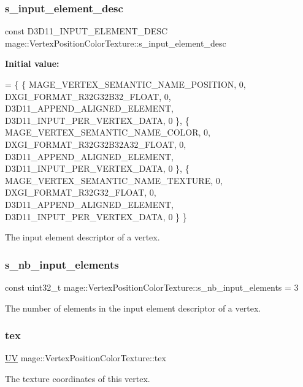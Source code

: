 \subsubsection{\texorpdfstring{s\+\_\+input\+\_\+element\+\_\+desc}{s\_input\_element\_desc}}
{\footnotesize\ttfamily const D3\+D11\+\_\+\+I\+N\+P\+U\+T\+\_\+\+E\+L\+E\+M\+E\+N\+T\+\_\+\+D\+E\+SC mage\+::\+Vertex\+Position\+Color\+Texture\+::s\+\_\+input\+\_\+element\+\_\+desc\hspace{0.3cm}{\ttfamily [static]}}

{\bfseries Initial value\+:}
\begin{DoxyCode}
= \{
        \{ MAGE\_VERTEX\_SEMANTIC\_NAME\_POSITION, 0, DXGI\_FORMAT\_R32G32B32\_FLOAT,    0, 
      D3D11\_APPEND\_ALIGNED\_ELEMENT, D3D11\_INPUT\_PER\_VERTEX\_DATA, 0 \},
        \{ MAGE\_VERTEX\_SEMANTIC\_NAME\_COLOR,    0, DXGI\_FORMAT\_R32G32B32A32\_FLOAT, 0, 
      D3D11\_APPEND\_ALIGNED\_ELEMENT, D3D11\_INPUT\_PER\_VERTEX\_DATA, 0 \},
        \{ MAGE\_VERTEX\_SEMANTIC\_NAME\_TEXTURE,  0, DXGI\_FORMAT\_R32G32\_FLOAT,       0, 
      D3D11\_APPEND\_ALIGNED\_ELEMENT, D3D11\_INPUT\_PER\_VERTEX\_DATA, 0 \}
    \}
\end{DoxyCode}
The input element descriptor of a vertex. \hypertarget{structmage_1_1_vertex_position_color_texture_a6b05ba63dce3ba54ad4b1b39b3c6f4f8}{}\label{structmage_1_1_vertex_position_color_texture_a6b05ba63dce3ba54ad4b1b39b3c6f4f8} 
\subsubsection{\texorpdfstring{s\+\_\+nb\+\_\+input\+\_\+elements}{s\_nb\_input\_elements}}
{\footnotesize\ttfamily const uint32\+\_\+t mage\+::\+Vertex\+Position\+Color\+Texture\+::s\+\_\+nb\+\_\+input\+\_\+elements = 3\hspace{0.3cm}{\ttfamily [static]}}

The number of elements in the input element descriptor of a vertex. \hypertarget{structmage_1_1_vertex_position_color_texture_adfbaa105e46bb65f502ec33eaa2e8b15}{}\label{structmage_1_1_vertex_position_color_texture_adfbaa105e46bb65f502ec33eaa2e8b15} 
\subsubsection{\texorpdfstring{tex}{tex}}
{\footnotesize\ttfamily \hyperlink{structmage_1_1_u_v}{UV} mage\+::\+Vertex\+Position\+Color\+Texture\+::tex}

The texture coordinates of this vertex. 